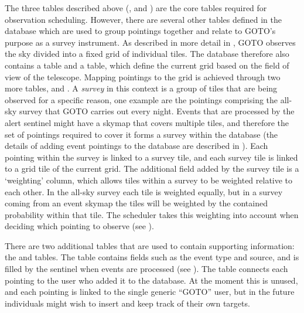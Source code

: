 \begin{colsection}
The three tables described above (,  and ) are the core tables required for observation scheduling. However, there are several other tables defined in the database which are used to group pointings together and relate to GOTO's purpose as a survey instrument. As described in more detail in , GOTO observes the sky divided into a fixed grid of individual tiles. The database therefore also contains a  table and a  table, which define the current grid based on the field of view of the telescope. Mapping pointings to the grid is achieved through two more tables,  and . A \textit{survey} in this context is a group of tiles that are being observed for a specific reason, one example are the pointings comprising the all-sky survey that GOTO carries out every night. Events that are processed by the alert sentinel might have a skymap that covers multiple tiles, and therefore the set of pointings required to cover it forms a survey within the database (the details of adding event pointings to the database are described in ). Each pointing within the survey is linked to a survey tile, and each survey tile is linked to a grid tile of the current grid. The additional field added by the survey tile is a `weighting' column, which allows tiles within a survey to be weighted relative to each other. In the all-sky survey each tile is weighted equally, but in a survey coming from an event skymap the tiles will be weighted by the contained probability within that tile. The scheduler takes this weighting into account when deciding which pointing to observe (see ).

There are two additional tables that are used to contain supporting information: the  and  tables. The  table contains fields such as the event type and source, and is filled by the sentinel when events are processed (see ). The  table connects each pointing to the user who added it to the database. At the moment this is unused, and each pointing is linked to the single generic ``GOTO'' user, but in the future individuals might wish to insert and keep track of their own targets.

\end{colsection}


